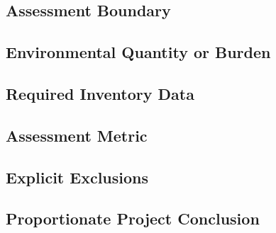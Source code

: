 %

\subsection{Assessment Boundary}
\label{sec:res-sus-mat-assessment-boundary}


\subsection{Environmental Quantity or Burden}
\label{sec:res-sus-mat-environmental-quantity-burden}


\subsection{Required Inventory Data}
\label{sec:res-sus-mat-required-inventory-data}


\subsection{Assessment Metric}
\label{sec:res-sus-mat-assessment-metric}


\subsection{Explicit Exclusions}
\label{sec:res-sus-mat-explicit-exclusions}


\subsection{Proportionate Project Conclusion}
\label{sec:res-sus-mat-proportionate-project-conclusion}


